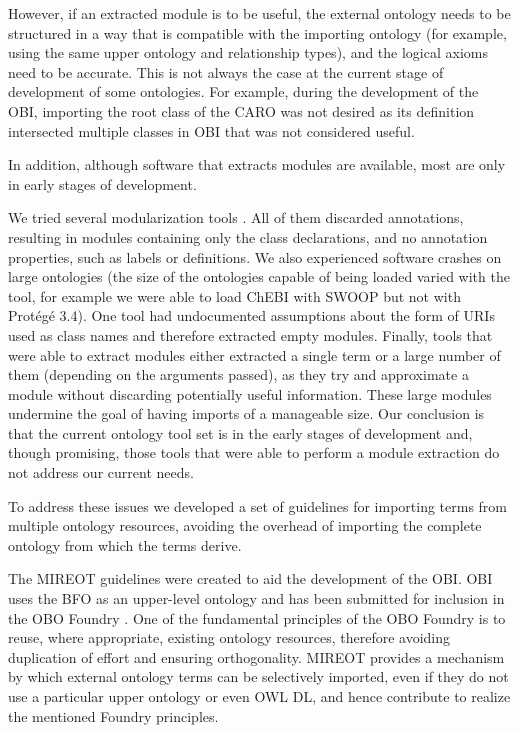 \documentclass{ao2e}%
\begin{document}
However, if an extracted module is to be useful, the external ontology needs to be structured in a way that is compatible with the importing ontology (for example, using the same upper ontology and relationship types), and the logical axioms need to be accurate. 
This is not always the case at the current stage of development of some ontologies.
For example, during the development of the \ac{OBI}\cite{OBI}, importing the root class of the \ac{CARO}\cite{CARO} was not desired as its definition intersected multiple classes in \ac{OBI} that was not considered useful. %

In addition, although software that extracts modules are available, most are only in early stages of development.

We tried several modularization tools \cite{Grau2} \cite{Jimenez}  \cite{Seidenberg} \cite{Sirin}. 
All of them discarded annotations, resulting in modules containing only the class declarations, and no annotation properties, such as labels or definitions.
We also experienced software crashes on large ontologies (the size of the ontologies capable of being loaded varied with the tool, for example we were able to load ChEBI \cite{ChEBI} with SWOOP but not with Prot\'eg\'e 3.4).
One tool %
had undocumented assumptions about the form of URIs used as class names and therefore extracted empty modules. 
Finally, tools %
that were able to extract modules either extracted a single term or a large number of them (depending on the arguments passed), as they try and approximate a module without discarding potentially useful information. These large modules undermine the goal of having imports of a manageable size.
Our conclusion is that the current ontology tool set is in the early stages of development and, though promising, those tools that were able to perform a module extraction do not address our current needs.

To address these issues we developed a set of guidelines for importing terms from multiple ontology resources, avoiding the overhead of importing the complete ontology from which the terms derive. 

The \ac{MIREOT} guidelines were created to aid the development of the \ac{OBI}.
\ac{OBI} uses the \ac{BFO} \cite{BFO} as an upper-level ontology and has been submitted for inclusion in the \ac{OBO} Foundry \cite{OBOFoundry}. 
One of the fundamental principles of the \ac{OBO} Foundry is to reuse, where appropriate, existing ontology resources, therefore avoiding duplication of effort and ensuring orthogonality.
\ac{MIREOT} provides a mechanism by which external ontology terms can be selectively imported, even if they do not use a particular upper ontology or even OWL DL, and hence contribute to realize the mentioned Foundry principles.
\end{document}
